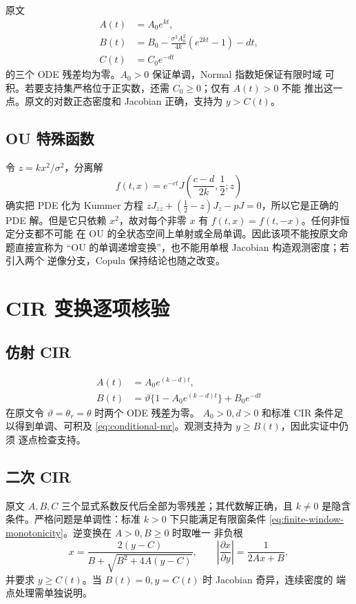 \documentclass[UTF8,11pt]{ctexart}
\begin{document}
原文
\begin{align*}
 A(t)&=A_0e^{kt},\\
 B(t)&=B_0-\frac{\sigma^2A_0^2}{4k}(e^{2kt}-1)-dt,\\
 C(t)&=C_0e^{-dt}
\end{align*}
的三个 ODE 残差均为零。$A_0>0$ 保证单调，Normal 指数矩保证有限时域
可积。若要支持集严格位于正实数，还需 $C_0\geq0$；仅有 $A(t)>0$ 不能
推出这一点。原文的对数正态密度和 Jacobian 正确，支持为 $y>C(t)$。

\subsection{OU 特殊函数}

令 $z=kx^2/\sigma^2$，分离解
\[
 f(t,x)=e^{-ct}J\!\left(\frac{c-d}{2k},\frac12;z\right)
\]
确实把 PDE 化为 Kummer 方程
$zJ_{zz}+(\tfrac12-z)J_z-pJ=0$，所以它是正确的 PDE 解。但是它只依赖
$x^2$，故对每个非零 $x$ 有 $f(t,x)=f(t,-x)$。任何非恒定分支都不可能
在 OU 的全状态空间上单射或全局单调。因此该项不能按原文命题直接宣称为
“OU 的单调递增变换”，也不能用单根 Jacobian 构造观测密度；若引入两个
逆像分支，Copula 保持结论也随之改变。

\section{CIR 变换逐项核验}

\subsection{仿射 CIR}

\begin{align*}
 A(t)&=A_0e^{(k-d)t},\\
 B(t)&=\vartheta\{1-A_0e^{(k-d)t}\}+B_0e^{-dt}
\end{align*}
在原文令 $\vartheta=\theta_r=\theta$ 时两个 ODE 残差为零。
$A_0>0,d>0$ 和标准 CIR 条件足以得到单调、可积及
\eqref{eq:conditional-mr}。观测支持为 $y\geq B(t)$，因此实证中仍须
逐点检查支持。

\subsection{二次 CIR}

原文 $A,B,C$ 三个显式系数反代后全部为零残差；其代数解正确，且
$k\ne0$ 是隐含条件。严格问题是单调性：标准 $k>0$ 下只能满足有限窗条件
\eqref{eq:finite-window-monotonicity}。逆变换在 $A>0,B\geq0$ 时取唯一
非负根
\[
 x=\frac{2(y-C)}{B+\sqrt{B^2+4A(y-C)}},\qquad
 \left|\frac{\partial x}{\partial y}\right|=\frac{1}{2Ax+B},
\]
并要求 $y\geq C(t)$。当 $B(t)=0,y=C(t)$ 时 Jacobian 奇异，连续密度的
端点处理需单独说明。
\end{document}
